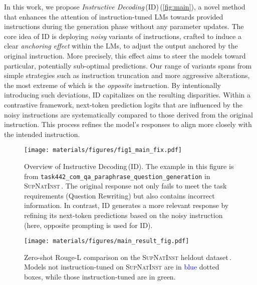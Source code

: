 In this work, we propose \textit{Instructive Decoding}\,(ID)\,(\autoref{fig:main}), a novel method that enhances the attention of instruction-tuned LMs towards provided instructions during the generation phase without any parameter updates. The core idea of ID is deploying \textit{noisy} variants of instructions, crafted to induce a clear \textit{anchoring effect} within the LMs, to adjust the output anchored by the original instruction. More precisely, this effect aims to steer the models toward particular, potentially sub-optimal predictions. Our range of variants spans from simple strategies such as instruction truncation and more aggressive alterations, the most extreme of which is the \textit{opposite} instruction. By intentionally introducing such deviations, ID capitalizes on the resulting disparities. Within a contrastive framework, next-token prediction logits that are influenced by the noisy instructions are systematically compared to those derived from the original instruction. This process refines the model's responses to align more closely with the intended instruction.

\begin{figure}[t!]
\centering
\vspace{-10pt}
\texttt{[image: materials/figures/fig1\_main\_fix.pdf]}
\vspace{-10pt}
\caption{Overview of Instructive Decoding\,(ID). The example in this figure is from \texttt{task442\_com\_qa\_paraphrase\_question\_generation} in \textsc{SupNatInst}\,\citep{sni_dataset}. The original response not only fails to meet the task requirements (Question Rewriting) but also contains incorrect information\protect\footnotemark. In contrast, ID generates a more relevant response by refining its next-token predictions based on the noisy instruction (here, opposite prompting is used for ID).}
\vspace{-12pt}
\label{fig:main}
\end{figure}
%

\begin{wrapfigure}{r}{0.54\textwidth}
\vspace{-15pt}
    \texttt{[image: materials/figures/main\_result\_fig.pdf]}
    \vspace{-15pt}
    \caption{Zero-shot Rouge-L comparison on the \textsc{SupNatInst} heldout dataset\,\citep{sni_dataset}. Models not instruction-tuned on \textsc{SupNatInst} are in \textcolor{blue}{blue} dotted boxes, while those instruction-tuned are in \textcolor{green!50!black}{green}.} 
    \label{fig:result_overall}
\vspace{-10pt}
\end{wrapfigure}

